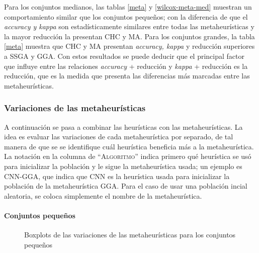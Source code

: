 Para los conjuntos medianos, las tablas \ref{meta} y \ref{wilcox-meta-med} muestran un comportamiento similar que los conjuntos pequeños; con la diferencia de que el \emph{accuracy y kappa} son estadísticamente similares entre todas las metaheurísticas y la mayor reducción la presentan CHC y MA. Para los conjuntos grandes, la tabla \ref{meta} muestra que CHC y MA presentan \emph{accuracy, kappa} y reducción superiores a SSGA y GGA. Con estos resultados se puede deducir que el principal factor que influye entre las relaciones \emph{accuracy} + reducción y \emph{kappa} + reducción es la reducción, que es la medida que presenta las diferencias más marcadas entre las metaheurísticas.


\subsubsection{Variaciones de las metaheurísticas}

A continuación se pasa a combinar las heurísticas con las metaheurísticas. La idea es evaluar las variaciones de cada metaheurística por separado, de tal manera de que se se identifique cuál heurística beneficia más a la metaheurística. La notación en la columna de ``\textsc{Algoritmo}'' indica primero qué heurística se usó para inicializar la población y le sigue la metaheurística usada; un ejemplo es CNN-GGA, que indica que CNN es la heurística usada para inicializar la población de la metaheurística GGA. Para el caso de usar una población incial aleatoria, se coloca simplemente el nombre de la metaheurística.


\paragraph{Conjuntos pequeños}

\begin{figure}[h!]

	\centering

\caption{Boxplots de las variaciones de las metaheurísticas para los conjuntos pequeños}
\label{small-all}
\end{figure}

